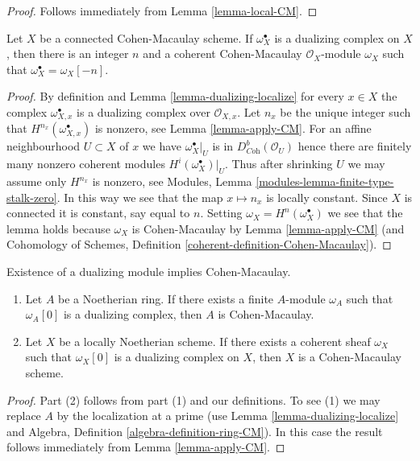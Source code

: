 \begin{proof}
Follows immediately from Lemma \ref{lemma-local-CM}.
\end{proof}

\begin{lemma}
\label{lemma-dualizing-module-CM-scheme}
Let $X$ be a connected Cohen-Macaulay scheme. If $\omega_X^\bullet$
is a dualizing complex on $X$, then there is an integer $n$
and a coherent Cohen-Macaulay $\mathcal{O}_X$-module $\omega_X$
such that $\omega_X^\bullet = \omega_X[-n]$.
\end{lemma}

\begin{proof}
By definition and Lemma \ref{lemma-dualizing-localize} for every $x \in X$
the complex $\omega_{X, x}^\bullet$ is a dualizing complex over
$\mathcal{O}_{X, x}$. Let $n_x$ be the unique integer such that
$H^{n_{x}}(\omega_{X, x}^\bullet)$ is nonzero, see
Lemma \ref{lemma-apply-CM}. For an affine neighbourhood $U \subset X$
of $x$ we have $\omega_X^\bullet|_U$ is in $D^b_{\textit{Coh}}(\mathcal{O}_U)$
hence there are finitely many nonzero coherent modules
$H^i(\omega_X^\bullet)|_U$. Thus after shrinking $U$ we may assume
only $H^{n_x}$ is nonzero, see
Modules, Lemma \ref{modules-lemma-finite-type-stalk-zero}.
In this way we see that the map $x \mapsto n_x$ is locally constant.
Since $X$ is connected it is constant, say equal to $n$.
Setting $\omega_X = H^n(\omega_X^\bullet)$ we see that the lemma
holds because $\omega_X$ is Cohen-Macaulay by
Lemma \ref{lemma-apply-CM}
(and Cohomology of Schemes, Definition
\ref{coherent-definition-Cohen-Macaulay}).
\end{proof}

\begin{lemma}
\label{lemma-has-dualizing-module-CM-scheme}
Existence of a dualizing module implies Cohen-Macaulay.
\begin{enumerate}
\item Let $A$ be a Noetherian ring. If there exists a finite $A$-module
$\omega_A$ such that $\omega_A[0]$ is a dualizing complex, then
$A$ is Cohen-Macaulay.
\item Let $X$ be a locally Noetherian scheme. If there exists a coherent sheaf
$\omega_X$ such that $\omega_X[0]$ is a dualizing complex on $X$, then
$X$ is a Cohen-Macaulay scheme.
\end{enumerate}
\end{lemma}

\begin{proof}
Part (2) follows from part (1) and our definitions.
To see (1) we may replace $A$ by the localization at a prime
(use Lemma \ref{lemma-dualizing-localize} and
Algebra, Definition \ref{algebra-definition-ring-CM}).
In this case the result follows immediately from
Lemma \ref{lemma-apply-CM}.
\end{proof}






